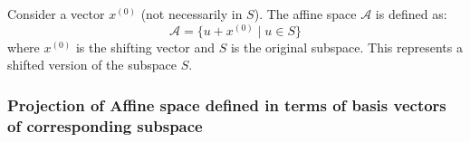 \begin{example}
    Consider a vector $x^{(0)}$ (not necessarily in $S$). The affine space $\mathcal{A}$ is defined as:
    \[
    \mathcal{A} = \{ u + x^{(0)} \mid u \in S \}
    \]
    where $x^{(0)}$ is the shifting vector and $S$ is the original subspace. This represents a shifted version of the subspace $S$.

\end{example}

\subsubsection{Projection of Affine space defined in terms of basis vectors of corresponding subspace}
